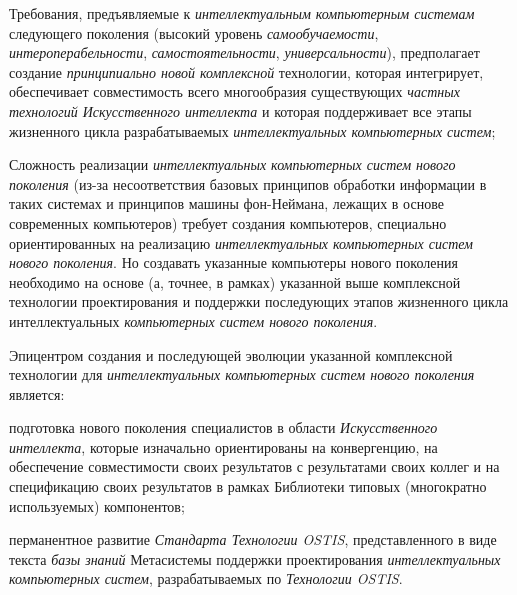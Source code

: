 \begin{textitemize}
	\item
	Требования, предъявляемые к \textit{интеллектуальным компьютерным системам} следующего поколения (высокий уровень \textit{самообучаемости}, \textit{интероперабельности}, \textit{самостоятельности}, \textit{универсальности}), предполагает создание \textit{принципиально новой комплексной} технологии, которая интегрирует, обеспечивает совместимость всего многообразия существующих \textit{частных технологий Искусственного интеллекта} и которая поддерживает все этапы жизненного цикла разрабатываемых \textit{интеллектуальных компьютерных систем};
	\item
	Сложность реализации \textit{интеллектуальных компьютерных систем нового поколения} (из-за несоответствия базовых принципов обработки информации в таких системах и принципов машины фон-Неймана, лежащих в основе современных компьютеров) требует создания компьютеров, специально ориентированных на реализацию \textit{интеллектуальных компьютерных систем нового поколения}. Но создавать указанные компьютеры нового поколения необходимо на основе (а, точнее, в рамках) указанной выше комплексной технологии проектирования и поддержки последующих этапов жизненного цикла интеллектуальных \textit{компьютерных систем нового поколения}.
	\item
	Эпицентром создания и последующей эволюции указанной комплексной технологии для \textit{интеллектуальных компьютерных систем нового поколения} является:
	\begin{textitemize}
		\item подготовка нового поколения специалистов в области \textit{Искусственного интеллекта}, которые изначально ориентированы на конвергенцию, на обеспечение совместимости своих результатов с результатами своих коллег и на спецификацию своих результатов в рамках Библиотеки типовых (многократно используемых) компонентов;
		\item перманентное развитие \textit{Стандарта Технологии OSTIS}, представленного в виде  текста \textit{базы знаний} Метасистемы поддержки проектирования \textit{интеллектуальных компьютерных систем}, разрабатываемых по \textit{Технологии OSTIS}.
	\end{textitemize}
\end{textitemize}

